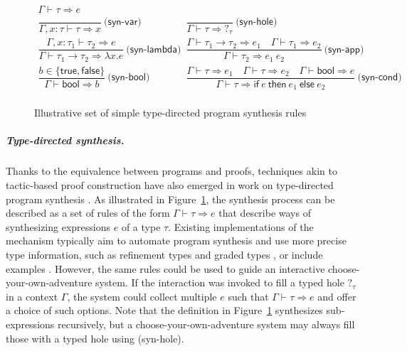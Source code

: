 \documentclass[a4paper,UKenglish,cleveref, autoref, thm-restate]{lipics-v2021}
\newcommand{\ident}[1]{\textsf{#1}}
\begin{document}
\begin{figure}
\[
\begin{array}{lcl}
\boxed{\Gamma \vdash \tau \Rightarrow e}\\[1em]
\dfrac{}{\Gamma,x:\tau \vdash \tau \Rightarrow x}~\ident{(syn-var)} &\quad&
\dfrac{}{\Gamma \vdash \tau \Rightarrow ?_\tau}~\ident{(syn-hole)}\\[2em]
\dfrac{\Gamma,x:\tau_1\vdash \tau_2 \Rightarrow e}{\Gamma \vdash \tau_1 \rightarrow \tau_2 \Rightarrow \lambda x.e}~\ident{(syn-lambda)}&&
\dfrac{\Gamma \vdash \tau_1\rightarrow\tau_2 \Rightarrow e_1 \quad \Gamma \vdash \tau_1 \Rightarrow e_2}{\Gamma \vdash \tau_2 \Rightarrow e_1~e_2}~\ident{(syn-app)}\\[2em]
\dfrac{b\in \{\ident{true},\ident{false}\} }{\Gamma \vdash \ident{bool} \Rightarrow b}~\ident{(syn-bool)} &\quad&
\dfrac{\Gamma \vdash \tau \Rightarrow e_1 \quad \Gamma \vdash \tau \Rightarrow e_2 \quad \Gamma \vdash \ident{bool} \Rightarrow e}{\Gamma \vdash \tau \Rightarrow \ident{if}~e~\ident{then}~e_1~\ident{else}~e_2}~\ident{(syn-cond)}\\
\end{array}
\]
\caption{Illustrative set of simple type-directed program synthesis rules}
\label{fig:synths}
\end{figure}

\subparagraph{Type-directed synthesis.}
Thanks to the equivalence between programs and proofs, techniques akin to tactic-based proof
construction have also emerged in work on type-directed program synthesis \cite{knoth-2023-synthesis}.
As illustrated in Figure~\ref{fig:synths}, the synthesis process can be described as a set of
rules of the form $\Gamma \vdash \tau \Rightarrow e$ that describe ways of synthesizing
expressions $e$ of a type $\tau$. Existing implementations of the mechanism typically aim to
automate program synthesis and use more precise type information, such as refinement types
\cite{polikarpova-2016-synthesis} and graded types \cite{hughes-2024-synthesis}, or include
examples \cite{osera-2015-synthesis}. However, the same rules could be used to guide an
interactive choose-your-own-adventure system. If the interaction was invoked to fill a typed
hole $?_\tau$ in a context $\Gamma$, the system could collect multiple $e$ such that
$\Gamma \vdash \tau \Rightarrow e$ and offer a choice of such options. Note that the definition
in Figure~\ref{fig:synths} synthesizes sub-expressions recursively, but a choose-your-own-adventure
system may always fill those with a typed hole using (\ident{syn-hole}).
\end{document}

